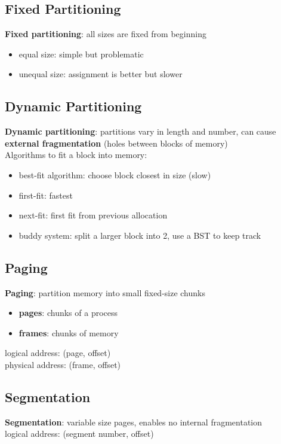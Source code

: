 \documentclass[]{article}
\theoremstyle{definition}
\begin{document}
	\subsection{Fixed Partitioning}
	\textbf{Fixed partitioning}: all sizes are fixed from beginning
	\begin{itemize}
		\item equal size: simple but problematic
		\item unequal size: assignment is better but slower
	\end{itemize}

	\subsection{Dynamic Partitioning}
	\textbf{Dynamic partitioning}: partitions vary in length and number, can cause \textbf{external fragmentation}
	(holes between blocks of memory) \\

	Algorithms to fit a block into memory:
	\begin{itemize}
		\item best-fit algorithm: choose block closest in size (slow)
		\item first-fit: fastest
		\item next-fit: first fit from previous allocation
		\item buddy system: split a larger block into 2, use a BST to keep track 
	\end{itemize}

	\subsection{Paging}
	\textbf{Paging}: partition memory into small fixed-size chunks
	\begin{itemize}
		\item \textbf{pages}: chunks of a process
		\item \textbf{frames}: chunks of memory
	\end{itemize}
	logical address: (page, offset) \\
	physical address: (frame, offset)

	\subsection{Segmentation}
	\textbf{Segmentation}: variable size pages, enables no internal fragmentation \\
	logical address: (segment number, offset) \\
\end{document}
